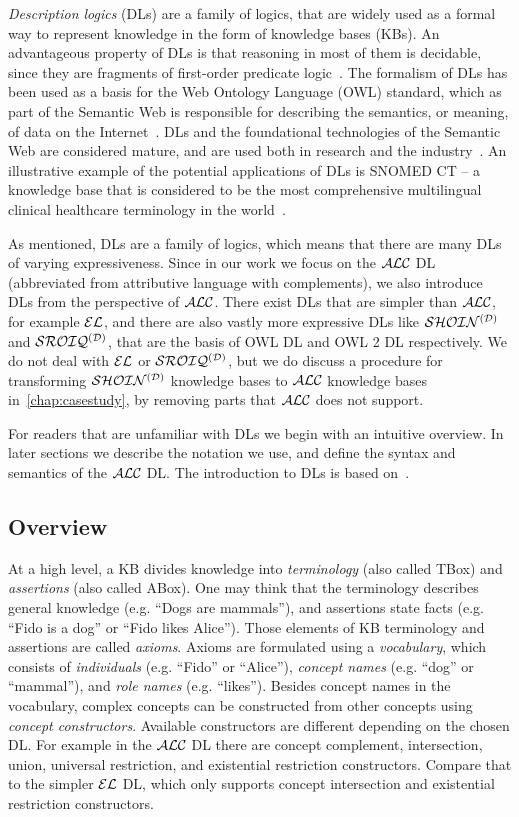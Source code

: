 \emph{Description logics} (DLs) are a family of logics, that are widely used as a formal way to represent knowledge in the form of knowledge bases (KBs).
An advantageous property of DLs is that reasoning in most of them is decidable, since they are fragments of first-order predicate logic~\cite{baader_basic_2003}.
The formalism of DLs has been used as a basis for the Web Ontology Language (OWL) standard, which as part of the Semantic Web is responsible for describing the semantics, or meaning, of data on the Internet~\cite{noauthor_owl_2004}.
DLs and the foundational technologies of the Semantic Web are considered mature, and are used both in research and the industry~\cite{hitzler_foundations_2009}.
An illustrative example of the potential applications of DLs is SNOMED CT -- a knowledge base that is considered to be the most comprehensive multilingual clinical healthcare terminology in the world~\cite{benson_principles_2010}.

As mentioned, DLs are a family of logics, which means that there are many DLs of varying expressiveness.
Since in our work we focus on the $\mathcal{ALC}$ DL (abbreviated from attributive language with complements), we also introduce DLs from the perspective of $\mathcal{ALC}$.
There exist DLs that are simpler than $\mathcal{ALC}$, for example $\mathcal{EL}$, and there are also vastly more expressive DLs like $\mathcal{SHOIN^{(D)}}$ and $\mathcal{SROIQ^{(D)}}$, that are the basis of OWL DL and OWL 2 DL respectively.
We do not deal with $\mathcal{EL}$ or $\mathcal{SROIQ^{(D)}}$, but we do discuss a procedure for transforming $\mathcal{SHOIN^{(D)}}$ knowledge bases to $\mathcal{ALC}$ knowledge bases in~\autoref{chap:casestudy}, by removing parts that $\mathcal{ALC}$ does not support.

For readers that are unfamiliar with DLs we begin with an intuitive overview.
In later sections we describe the notation we use, and define the syntax and semantics of the $\mathcal{ALC}$ DL.
The introduction to DLs is based on~\cite{rudolph_foundations_2011}.

\subsection{Overview}

At a high level, a KB divides knowledge into \emph{terminology} (also called TBox) and \emph{assertions} (also called ABox).
One may think that the terminology describes general knowledge (e.g. ``Dogs are mammals''), and assertions state facts (e.g. ``Fido is a dog'' or ``Fido likes Alice'').
Those elements of KB terminology and assertions are called \emph{axioms}.
Axioms are formulated using a \emph{vocabulary}, which consists of \emph{individuals} (e.g. ``Fido'' or ``Alice''), \emph{concept names} (e.g. ``dog'' or ``mammal''), and \emph{role names} (e.g. ``likes'').
Besides concept names in the vocabulary, complex concepts can be constructed from other concepts using \emph{concept constructors}.
Available constructors are different depending on the chosen DL.
For example in the $\mathcal{ALC}$ DL there are concept complement, intersection, union, universal restriction, and existential restriction constructors.
Compare that to the simpler $\mathcal{EL}$ DL, which only supports concept intersection and existential restriction constructors.

